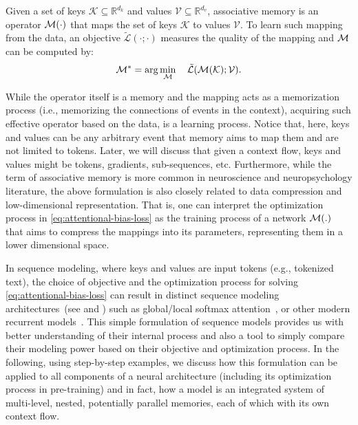 \begin{dfn} \label{def:associative-memory}
    Given a set of keys $\mathcal{K} \subseteq \mathbb{R}^{d_k}$ and values $\mathcal{V} \subseteq \mathbb{R}^{d_v}$, associative memory is an operator $\mathcal{M}(\cdot)$  
    that maps the set of keys $\mathcal{K}$ to values $\mathcal{V}$. To learn such mapping from the data, an objective $\tilde{\mathcal{L}}(\cdot;\cdot)$ measures the quality of the mapping and $\mathcal{M}$ 
    can be computed by:
\begin{align}\label{eq:attentional-bias-loss}
    \mathcal{M}^* = \arg\min_{\mathcal{M}}\quad \tilde{\mathcal{L}}(\mathcal{M}(\mathcal{K}); \mathcal{V}).
\end{align}
\end{dfn}
While the operator itself is a memory and the mapping acts as a memorization process (i.e., memorizing the connections of events in the context), acquiring such effective operator based on the data, is a learning process. Notice that, here, keys and values can be any arbitrary event that memory aims to map them and are not limited to tokens. Later, we will discuss that given a context flow, keys and values might be tokens, gradients, sub-sequences, etc. Furthermore, while the term of associative memory is more common in neuroscience and neuropsychology literature, the above formulation is also closely related to data compression and low-dimensional representation. That is, one can interpret the optimization process in \autoref{eq:attentional-bias-loss} as the training process of a network $\mathcal{M}(.)$ that aims to compress the mappings into its parameters, representing them in a lower dimensional space.   


In sequence modeling, where keys and values are input tokens (e.g., tokenized text), the choice of objective and the optimization process for solving \autoref{eq:attentional-bias-loss} can result in distinct sequence modeling architectures~(see \cite{liu2024longhorn} and \cite{behrouz2025Miras}) such as global/local softmax attention~\citep{transformers}, or other modern recurrent models~\citep{katharopoulos2020transformers, sun2023retentive, behrouz2024titans}. This simple formulation of sequence models provides us with better understanding of their internal process and also a tool to simply compare their modeling power based on their objective and optimization process. In the following, using step-by-step examples, we discuss how this formulation can be applied to all components of a neural architecture (including its optimization process in pre-training) and in fact, how a model is an integrated system of multi-level, nested, potentially parallel memories, each of which with its own context flow. 


